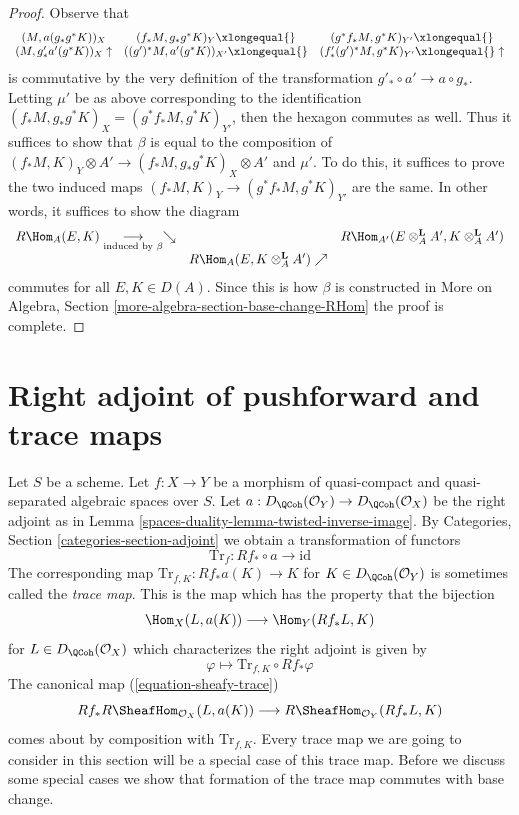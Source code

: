 \begin{proof}
\medskip\noindent
Observe that
$$
\begin{array}{ccc}(M, a(g_*g^*K))_X & (f_*M, g_* g^*K)_Y \xlongequal{} & (g^*f_*M, g^*K)_{Y'} \xlongequal{} \\ (M, g'_* a'(g^*K))_X \uparrow & ((g')^*M, a'(g^*K))_{X'} \xlongequal{} & (f'_*(g')^*M, g^*K)_{Y'} \xlongequal{}\uparrow\end{array}
$$
is commutative by the very definition of the transformation
$g'_* \circ a' \to a \circ g_*$. Letting $\mu'$ be as above
corresponding to the identification
$(f_*M, g_*g^*K)_X = (g^*f_*M, g^*K)_{Y'}$, then the
hexagon commutes as well. Thus it suffices to show that
$\beta$ is equal to the composition of
$(f_*M, K)_Y \otimes A' \to (f_*M, g_*g^*K)_X \otimes A'$
and $\mu'$. To do this, it suffices to prove the two induced maps
$(f_*M, K)_Y \to (g^*f_*M, g^*K)_{Y'}$ are the same.
In other words, it suffices to show the diagram
$$
\begin{array}{ccc}R\Hom_A(E, K) \underset{\text{induced by }\beta}{\longrightarrow}\searrow &  & R\Hom_{A'}(E \otimes_A^\mathbf{L} A', K \otimes_A^\mathbf{L} A') \\  & R\Hom_A(E, K \otimes_A^\mathbf{L} A') \nearrow & \end{array}
$$
commutes for all $E, K \in D(A)$. Since this is how $\beta$ is constructed in
More on Algebra, Section \ref{more-algebra-section-base-change-RHom}
the proof is complete.
\end{proof}

\section{Right adjoint of pushforward and trace maps}
\label{spaces-duality-section-trace}
Let $S$ be a scheme.
Let $f : X \to Y$ be a morphism of quasi-compact and quasi-separated
algebraic spaces over $S$.
Let $a : D_\QCoh(\mathcal{O}_Y) \to D_\QCoh(\mathcal{O}_X)$
be the right adjoint as in Lemma \ref{spaces-duality-lemma-twisted-inverse-image}. By
Categories, Section \ref{categories-section-adjoint} we obtain a
transformation of functors
$$
\text{Tr}_f : Rf_* \circ a \longrightarrow \text{id}
$$
The corresponding map $\text{Tr}_{f, K} : Rf_*a(K) \longrightarrow K$
for $K \in D_\QCoh(\mathcal{O}_Y)$ is sometimes called the {\it trace map}.
This is the map which has the property that the bijection
$$
\Hom_X(L, a(K)) \longrightarrow \Hom_Y(Rf_*L, K)
$$
for $L \in D_\QCoh(\mathcal{O}_X)$ which characterizes the right adjoint
is given by
$$
\varphi \longmapsto \text{Tr}_{f, K} \circ Rf_*\varphi
$$
The canonical map (\ref{equation-sheafy-trace})
$$
Rf_*R\SheafHom_{\mathcal{O}_X}(L, a(K))
\longrightarrow
R\SheafHom_{\mathcal{O}_Y}(Rf_*L, K)
$$
comes about by composition with $\text{Tr}_{f, K}$.
Every trace map we are going to consider in this section will be a
special case of this trace map. Before we discuss some special cases
we show that formation of the trace map commutes with base change.

